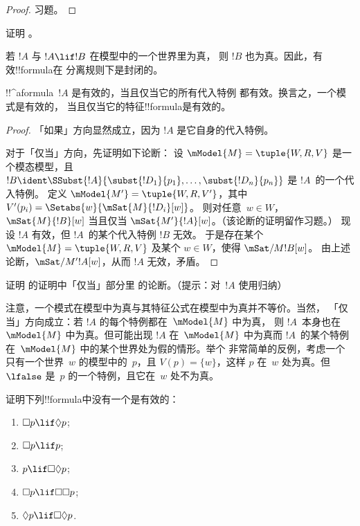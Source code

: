 \documentclass[../../../include/open-logic-section]{subfiles}
\begin{document}
\begin{proof}
  习题。
\end{proof}

\begin{prob}
  证明 。
\end{prob}

\begin{prop}
  若 $!A$ 与 $!A \lif !B$ 在模型中的一个世界里为真，
  则 $!B$ 也为真。因此，有效!!{formula}在
  分离规则下是封闭的。
\end{prop}

\begin{prop}
  !!^a{formula}~$!A$ 是有效的，当且仅当它的所有代入特例
  都有效。换言之，一个模式是有效的，
  当且仅当它的特征!!{formula}是有效的。
\end{prop}

\begin{proof}
  「如果」方向显然成立，因为 $!A$ 是它自身的代入特例。

  对于「仅当」方向，先证明如下论断：
  设 $\mModel{M} = \tuple{W, R, V}$ 是一个模态模型，且 $!B \ident \SSubst{!A}{\subst{!D_1}{p_1},\dots,\subst{!D_n}{p_n}}$ 是 $!A$~的一个代入特例。
  定义 $\mModel{M'} = \tuple{W, R, V'}$，其中 $V'(p_i) = \Setabs{w}{\mSat{M}{!D_i}[w]}$。
  则对任意~$w \in W$，$\mSat{M}{!B}[w]$ 当且仅当 $\mSat{M'}{!A}[w]$。（该论断的证明留作习题。）
  现设 $!A$ 有效，但 $!A$~的某个代入特例 $!B$ 无效。
  于是存在某个 $\mModel{M} = \tuple{W, R, V}$ 及某个 $w \in W$，使得 $\mSat/{M}{!B}[w]$。
  由上述论断，$\mSat/{M'}{!A}[w]$，从而 $!A$ 无效，矛盾。
\end{proof}
\begin{prob}
  证明
   的证明中「仅当」部分里
  的论断。（提示：对~$!A$ 使用归纳）
\end{prob}

注意，一个模式在模型中为真与其特征公式在模型中为真并不等价。当然，
「仅当」方向成立：若 $!A$ 的每个特例都在~$\mModel{M}$ 中为真，
则 $!A$~本身也在~$\mModel{M}$ 中为真。但可能出现 $!A$ 在~$\mModel{M}$
中为真而 $!A$~的某个特例在~$\mModel{M}$ 中的某个世界处为假的情形。举个
非常简单的反例，考虑一个只有一个世界~$w$ 的模型中的~$p$，且 $V(p) =
\{w\}$，这样 $p$ 在~$w$ 处为真。但 $\lfalse$ 是~$p$ 的一个特例，且它在~$w$
处不为真。

\begin{prob}
  证明下列!!{formula}中没有一个是有效的：
  \begin{enumerate}
    \item[\Ax{D}:] \quad $\Box p \lif \Diamond p$;
    \item[\Ax{T}:] \quad $\Box p \lif p$;
    \item[\Ax{B}:] \quad $p \lif \Box\Diamond p$;
    \item[\Ax{4}:] \quad $\Box p \lif \Box \Box p$;
    \item[\Ax{5}:] \quad $\Diamond p \lif \Box \Diamond
      p$.
  \end{enumerate}
\end{prob}
\end{document}
